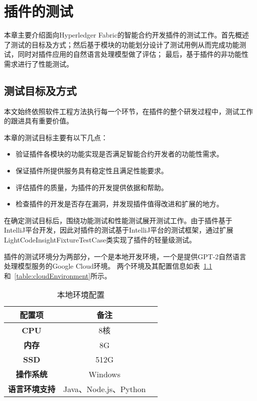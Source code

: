 \chapter{插件的测试}

本章主要介绍面向Hyperledger Fabric的智能合约开发插件的测试工作。首先概述了测试的目标及方式；然后基于模块的功能划分设计了测试用例从而完成功能测试，同时对插件应用的自然语言处理模型做了评估；
最后，基于插件的非功能性需求进行了性能测试。

\section{测试目标及方式}

本文始终依照软件工程方法执行每一个环节，在插件的整个研发过程中，测试工作的跟进具有重要价值。

本章的测试目标主要有以下几点：

\begin{itemize}
    \item 验证插件各模块的功能实现是否满足智能合约开发者的功能性需求。
    \item 保证插件所提供服务具有稳定性且满足性能要求。
    \item 评估插件的质量，为插件的开发提供依据和帮助。
    \item 检查插件的开发是否存在漏洞，并发现插件值得改进和扩展的地方。
\end{itemize}

在确定测试目标后，围绕功能测试和性能测试展开测试工作。由于插件基于IntelliJ平台开发，因此对插件的测试基于IntelliJ平台的测试框架，通过扩展LightCodeInsightFixtureTestCase类实现了插件的轻量级测试。

插件的测试环境分为两部分，一个是本地开发环境，一个是提供GPT-2自然语言处理模型服务的Google Cloud环境。
两个环境及其配置信息如表~\ref{table:localEnvironment}和~\ref{table:cloudEnvironment}所示。

\begin{table}[htb]\scriptsize
\centering
\caption{本地环境配置}
\vspace{2mm}
\begin{tabular}{ccc}
\toprule
\textbf{配置项}&\textbf{备注}\\
\midrule
\textbf{CPU}&8核\\ \hline
\textbf{内存}&8G\\ \hline
\textbf{SSD}&512G\\ \hline
\textbf{操作系统}&Windows\\ \hline
\textbf{语言环境支持}&Java、Node.js、Python\\
\bottomrule
\end{tabular}
\label{table:localEnvironment}
\end{table}


